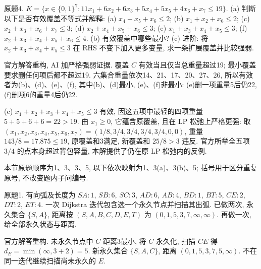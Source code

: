 \begin{exercise}\label{ass:15053-rec8-q4}
原题4. $K=\{x\in\{0,1\}^7:11x_1+6x_2+6x_3+5x_4+5x_5+4x_6+x_7\le19\}$.
(a) 判断以下是否有效覆盖不等式并解释: (a) $x_4+x_5+x_6\le2$; (b) $x_1+x_2+x_6\le2$; (c) $x_2+x_3+x_6+x_7\le3$; (d) $x_2+x_4+x_5+x_6\le3$; (e) $x_1+x_3+x_4+x_5\le3$; (f) $x_2+x_3+x_4+x_5+x_6\le4$.
(b) 有效覆盖中哪些最小?
(c) 进阶: 将 $x_2+x_3+x_4+x_5\le3$ 在 RHS 不变下加入更多变量, 求一条扩展覆盖并比较强弱.
\end{exercise}
\begin{solution}
官方解答重构, AI 加严格强弱证据. 覆盖 $C$ 有效当且仅当总重量超过19; 最小覆盖要求删任何项后都不超过19. 六集合重量依次14、21、17、20、27、26, 所以有效者为(b)、(d)、(e)、(f), 其中(b)、(d)最小, (e)、(f)非最小: (e)删一项重量5后仍22, (f)删项6的重量4后仍22.

(c) $x_1+x_2+x_3+x_4+x_5\le3$ 有效, 因这五项中最轻的四项重量 $5+5+6+6=22>19$. 由 $x_1\ge0$, 它蕴含原覆盖, 且在 LP 松弛上严格更强: 取 $(x_1,x_2,x_3,x_4,x_5,x_6,x_7)=(1/8,3/4,3/4,3/4,3/4,0,0)$, 重量 $143/8=17.875\le19$, 原覆盖和3满足, 新覆盖和 $25/8>3$ 违反. 官方所举全五项 $3/4$ 的点本身超过背包容量, 本解提供了仍在原 LP 松弛内的反例.
\end{solution}

本节原题顺序为1、3、3、5, 以下依次映射为1、3(a)、3(b)、5; 括号用于区分重复原号, 不改变题内子问编号.
\begin{exercise}\label{ass:15053-rec9-q1}
原题1. 有向弧及长度为 $SA:1$, $SB:6$, $SC:3$, $AD:6$, $AB:4$, $BD:1$, $BT:5$, $CE:2$, $DT:2$, $ET:4$. 一次 Dijkstra 迭代包含选一个永久节点并扫描其出弧. 已做两次, 永久集合 $\{S,A\}$, 距离按 $(S,A,B,C,D,E,T)$ 为 $(0,1,5,3,7,\infty,\infty)$. 再做一次, 给全部永久状态与距离.
\begin{center}\end{center}
\end{exercise}
\begin{solution}
官方解答重构. 未永久节点中 $C$ 距离3最小, 将 $C$ 永久化, 扫描 $CE$ 得 $d_E=\min(\infty,3+2)=5$. 新永久集合 $\{S,A,C\}$, 距离 $(0,1,5,3,7,5,\infty)$. 不在同一迭代继续扫描尚未永久的 $E$.
\end{solution}

